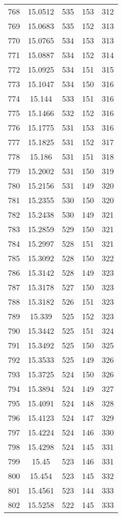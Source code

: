 \documentclass[12pt,a4paper]{article}
\begin{document}
\begin{tabular}{r|cccc}
	768 & 15.0512 & 535 & 153 & 312 \\
	769 & 15.0683 & 535 & 152 & 313 \\
	770 & 15.0765 & 534 & 153 & 313 \\
	771 & 15.0887 & 534 & 152 & 314 \\
	772 & 15.0925 & 534 & 151 & 315 \\
	773 & 15.1047 & 534 & 150 & 316 \\
	774 & 15.144 & 533 & 151 & 316 \\
	775 & 15.1466 & 532 & 152 & 316 \\
	776 & 15.1775 & 531 & 153 & 316 \\
	777 & 15.1825 & 531 & 152 & 317 \\
	778 & 15.186 & 531 & 151 & 318 \\
	779 & 15.2002 & 531 & 150 & 319 \\
	780 & 15.2156 & 531 & 149 & 320 \\
	781 & 15.2355 & 530 & 150 & 320 \\
	782 & 15.2438 & 530 & 149 & 321 \\
	783 & 15.2859 & 529 & 150 & 321 \\
	784 & 15.2997 & 528 & 151 & 321 \\
	785 & 15.3092 & 528 & 150 & 322 \\
	786 & 15.3142 & 528 & 149 & 323 \\
	787 & 15.3178 & 527 & 150 & 323 \\
	788 & 15.3182 & 526 & 151 & 323 \\
	789 & 15.339 & 525 & 152 & 323 \\
	790 & 15.3442 & 525 & 151 & 324 \\
	791 & 15.3492 & 525 & 150 & 325 \\
	792 & 15.3533 & 525 & 149 & 326 \\
	793 & 15.3725 & 524 & 150 & 326 \\
	794 & 15.3894 & 524 & 149 & 327 \\
	795 & 15.4091 & 524 & 148 & 328 \\
	796 & 15.4123 & 524 & 147 & 329 \\
	797 & 15.4224 & 524 & 146 & 330 \\
	798 & 15.4298 & 524 & 145 & 331 \\
	799 & 15.45 & 523 & 146 & 331 \\
	800 & 15.454 & 523 & 145 & 332 \\
	801 & 15.4561 & 523 & 144 & 333 \\
	802 & 15.5258 & 522 & 145 & 333 \\

\end{tabular}
\end{document}
